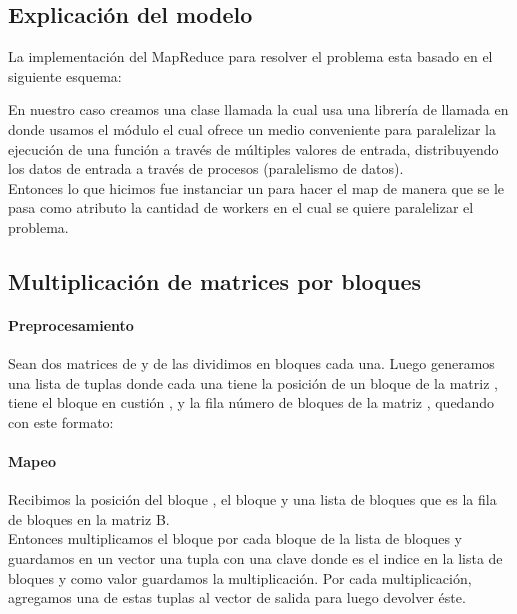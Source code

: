 \subsection{Explicación del modelo}
    La implementación del MapReduce para resolver el problema esta basado en el
    siguiente esquema:\\

    \def\text{Esquema de un map reduce}
    \def\path{map_reduce_schema.png}
    \def\scale{.6}
    

    En nuestro caso creamos una clase llamada  la cual usa una
    librería de  llamada  en donde usamos el
    módulo  el cual ofrece un medio conveniente para paralelizar la
    ejecución de una función a través de múltiples valores de entrada, distribuyendo
    los datos de entrada a través de procesos (paralelismo de datos).\\

    Entonces lo que hicimos fue instanciar un  para hacer el map de
    manera que se le pasa como atributo la cantidad de workers en el cual se
    quiere paralelizar el problema.

\subsection{Multiplicación de matrices por bloques}

    \paragraph{Preprocesamiento}

        Sean dos matrices  de  y  de  las
        dividimos en  bloques cada una. Luego generamos una
        lista de tuplas donde cada una tiene la posición  de un bloque
        de la matriz , tiene el bloque en custión ,
        y la fila número  de bloques de la matriz , quedando
        con este formato: \\

    \paragraph{Mapeo}

        Recibimos la posición  del bloque , el bloque
         y una lista de bloques  que es la fila  de
        bloques en la matriz B.\\
        Entonces multiplicamos el bloque  por cada bloque de la lista de
        bloques  y guardamos en un vector una tupla con una clave
         donde  es el indice en la lista de
        bloques  y como valor guardamos la multiplicación. Por cada
        multiplicación, agregamos una de estas tuplas al vector de salida para
        luego devolver éste.

